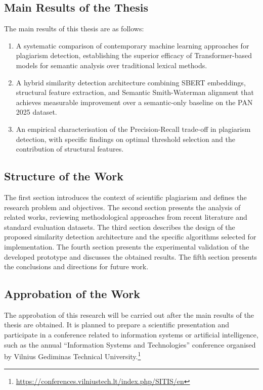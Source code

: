 \documentclass[12pt, a4paper]{article}
\begin{document}
\subsection{Main Results of the Thesis}

The main results of this thesis are as follows:

\begin{enumerate}
	\item A systematic comparison of contemporary machine learning approaches for plagiarism detection, establishing the superior efficacy of Transformer-based models for semantic analysis over traditional lexical methods.

	\item A hybrid similarity detection architecture combining SBERT embeddings, structural feature extraction, and Semantic Smith-Waterman alignment that achieves measurable improvement over a semantic-only baseline on the PAN 2025 dataset.

	\item An empirical characterisation of the Precision-Recall trade-off in plagiarism detection, with specific findings on optimal threshold selection and the contribution of structural features.
\end{enumerate}

\subsection{Structure of the Work}

The first section introduces the context of scientific plagiarism and defines the research problem and objectives. The second section presents the analysis of related works, reviewing methodological approaches from recent literature and standard evaluation datasets. The third section describes the design of the proposed similarity detection architecture and the specific algorithms selected for implementation. The fourth section presents the experimental validation of the developed prototype and discusses the obtained results. The fifth section presents the conclusions and directions for future work.

\subsection{Approbation of the Work}

The approbation of this research will be carried out after the main results of the thesis are obtained. It is planned to prepare a scientific presentation and participate in a conference related to information systems or artificial intelligence, such as the annual ``Information Systems and Technologies'' conference organised by Vilnius Gediminas Technical University.\footnote{\url{https://conferences.vilniustech.lt/index.php/SITIS/en}}
\end{document}
